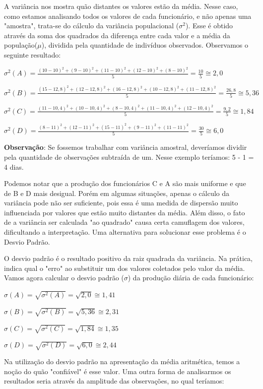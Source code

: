 \documentclass[a4paper,11pt]{article}
\begin{document}
A variância nos mostra quão distantes os valores estão da média. Nesse caso, como estamos analisando todos os valores de cada funcionário, e não apenas uma "amostra", trata-se do cálculo da variância populacional ($\sigma^{2}$). Esse é obtido através da soma dos quadrados da diferença entre cada valor e a média da população($\mu$), dividida pela quantidade de indivíduos observados. Observamos o seguinte resultado:

$ \sigma^{2}(A) = 
\frac{(10 - 10)^{2} + (9 - 10)^{2} + (11 - 10)^{2} + (12 - 10)^{2} + (8 - 10)^{2}}{5}
= \frac{10}{5} \cong 2,0$

$\sigma^{2}(B) = \frac{(15 - 12,8)^{2} + (12 - 12,8)^{2} + (16 - 12,8)^{2} + (10 - 12,8)^{2} + (11 - 12,8)^{2}}{5} = \frac{26,8}{5} \cong 5,36$

$\sigma^{2}(C) = \frac{(11 - 10,4)^{2} + (10 - 10,4)^{2} + (8 - 10,4)^{2} + (11 - 10,4)^{2} + (12 - 10,4)^{2}}{5} = \frac{9,2}{5} \cong 1,84$

$\sigma^{2}(D) = \frac{(8 - 11)^{2} + (12 - 11)^{2} + (15 - 11)^{2} + (9 - 11)^{2} + (11 - 11)^{2}}{5} = \frac{30}{5} \cong 6,0$

\textbf{Observação}: Se fossemos trabalhar com variância amostral, deveríamos dividir pela quantidade de observações subtraída de um. Nesse exemplo teríamos: 5 - 1 = 4 dias.

Podemos notar que a produção dos funcionários C e A são mais uniforme e que de B e D mais desigual. Porém em algumas situações, apenas o cálculo da variância pode não ser suficiente, pois essa é uma medida de dispersão muito influenciada por valores que estão muito distantes da média. Além disso, o fato de a variância ser calculada "ao quadrado" causa certa camuflagem dos valores, dificultando a interpretação. Uma alternativa para solucionar esse problema é o Desvio Padrão.

O desvio padrão é o resultado positivo da raiz quadrada da variância. Na prática, indica qual o "erro" ao substituir um dos valores coletados pelo valor da média. Vamos agora calcular o desvio padrão ($\sigma$) da produção diária de cada funcionário:

$\sigma(A) = \sqrt{\sigma^{2}(A)} = \sqrt{2,0} \cong 1,41$

$\sigma(B) = \sqrt{\sigma^{2}(B)} = \sqrt{5,36} \cong 2,31$

$\sigma(C) = \sqrt{\sigma^{2}(C)} = \sqrt{1,84} \cong 1,35$

$\sigma(D) = \sqrt{\sigma^{2}(D)} = \sqrt{6,0} \cong 2,44$

Na utilização do desvio padrão na apresentação da média aritmética, temos a noção do quão "confiável" é esse valor. Uma outra forma de analisarmos os resultados seria através da amplitude das observações, no qual teríamos:
\end{document}
